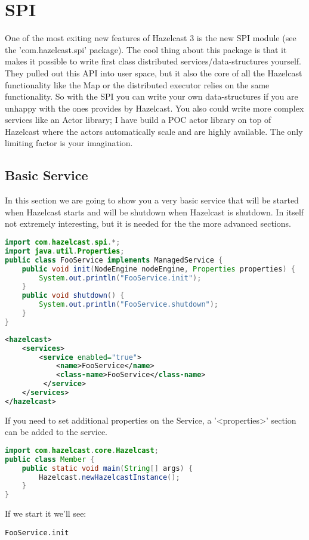 \chapter{SPI}

One of the most exiting new features of Hazelcast 3 is the new SPI module (see the 'com.hazelcast.spi' package). The cool thing about this package is that it makes it possible to write first class distributed services/data-structures yourself. They pulled out this API into user space, but it also the core of all the Hazelcast functionality like the Map or the distributed executor relies on the same functionality. So with the SPI you can write your own data-structures if you are unhappy with the ones provides by Hazelcast. You also could write more complex services like an Actor library; I have build a POC actor library on top of Hazelcast where the actors automatically scale and are highly available. The only limiting factor is your imagination.

\section{Basic Service}
In this section we are going to show you a very basic service that will be started when Hazelcast starts and will be shutdown when Hazelcast is shutdown. In itself not extremely interesting, but it is needed for the the more advanced sections.

\begin{lstlisting}[language=java]
import com.hazelcast.spi.*;
import java.util.Properties;
public class FooService implements ManagedService {
    public void init(NodeEngine nodeEngine, Properties properties) {
        System.out.println("FooService.init");
    }
    public void shutdown() {
        System.out.println("FooService.shutdown");
    }
}
\end{lstlisting}

\begin{lstlisting}[language=xml]
<hazelcast>
    <services>
        <service enabled="true">
            <name>FooService</name>
            <class-name>FooService</class-name>
         </service>
    </services>
</hazelcast>
\end{lstlisting}
If you need to set additional properties on the Service, a '<properties>' section can be added to the service.

\begin{lstlisting}[language=java]
import com.hazelcast.core.Hazelcast;
public class Member {
    public static void main(String[] args) {
        Hazelcast.newHazelcastInstance();
    }
}
\end{lstlisting}
If we start it we'll see:
\begin{lstlisting}
FooService.init
\end{lstlisting}

